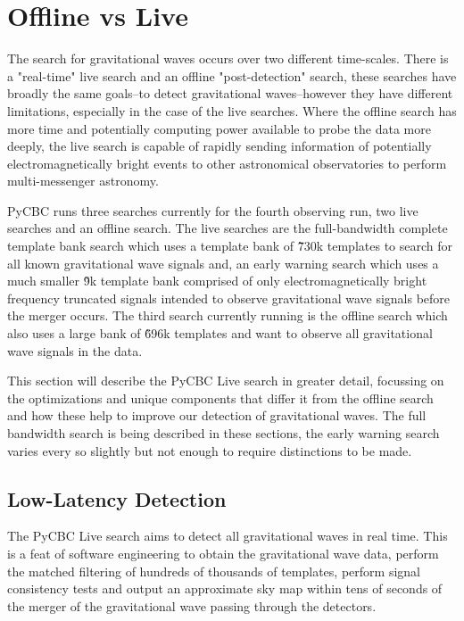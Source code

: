\section{\label{sec:offline-vs-live}Offline vs Live}

The search for gravitational waves occurs over two different time-scales. There is a "real-time" live search and an offline "post-detection" search, these searches have broadly the same goals--to detect gravitational waves--however they have different limitations, especially in the case of the live searches. Where the offline search has more time and potentially computing power available to probe the data more deeply, the live search is capable of rapidly sending information of potentially electromagnetically bright events to other astronomical observatories to perform multi-messenger astronomy.

PyCBC runs three searches currently for the fourth observing run, two live searches and an offline search. The live searches are the full-bandwidth complete template bank search which uses a template bank of \~730k templates to search for all known gravitational wave signals and, an early warning search which uses a much smaller \~9k template bank comprised of only electromagnetically bright frequency truncated signals intended to observe gravitational wave signals before the merger occurs. The third search currently running is the offline search which also uses a large bank of \~696k templates and want to observe all gravitational wave signals in the data.

This section will describe the PyCBC Live search in greater detail, focussing on the optimizations and unique components that differ it from the offline search and how these help to improve our detection of gravitational waves. The full bandwidth search is being described in these sections, the early warning search varies every so slightly but not enough to require distinctions to be made.

\subsection{\label{sec:low-latency-detection}Low-Latency Detection}

The PyCBC Live search aims to detect all gravitational waves in real time. This is a feat of software engineering to obtain the gravitational wave data, perform the matched filtering of hundreds of thousands of templates, perform signal consistency tests and output an approximate sky map within tens of seconds of the merger of the gravitational wave passing through the detectors.

